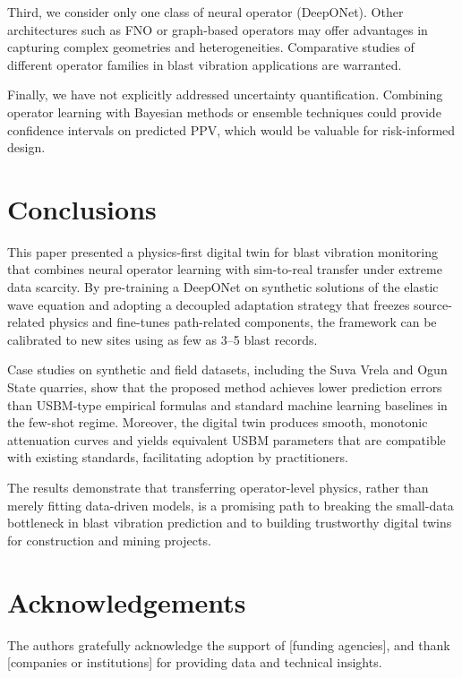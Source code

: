 \documentclass[a4paper,fleqn]{cas-sc}
\begin{document}
Third, we consider only one class of neural operator (DeepONet).
Other architectures such as FNO or graph-based operators
may offer advantages in capturing complex geometries and heterogeneities.
Comparative studies of different operator families
in blast vibration applications are warranted.

Finally, we have not explicitly addressed uncertainty quantification.
Combining operator learning with Bayesian methods or ensemble techniques
could provide confidence intervals on predicted PPV,
which would be valuable for risk-informed design.

\section{Conclusions}
\label{sec:conclusion}

This paper presented a physics-first digital twin for blast vibration monitoring
that combines neural operator learning with sim-to-real transfer
under extreme data scarcity.
By pre-training a DeepONet on synthetic solutions of the elastic wave equation
and adopting a decoupled adaptation strategy that freezes source-related physics
and fine-tunes path-related components, the framework can be calibrated
to new sites using as few as 3--5 blast records.

Case studies on synthetic and field datasets, including the Suva Vrela
and Ogun State quarries, show that the proposed method achieves
lower prediction errors than USBM-type empirical formulas
and standard machine learning baselines in the few-shot regime.
Moreover, the digital twin produces smooth, monotonic attenuation curves
and yields equivalent USBM parameters that are compatible with existing standards,
facilitating adoption by practitioners.

The results demonstrate that transferring operator-level physics,
rather than merely fitting data-driven models,
is a promising path to breaking the small-data bottleneck
in blast vibration prediction and to building trustworthy digital twins
for construction and mining projects.

\section*{Acknowledgements}

The authors gratefully acknowledge the support of [funding agencies],
and thank [companies or institutions] for providing data and technical insights.



\end{document}
